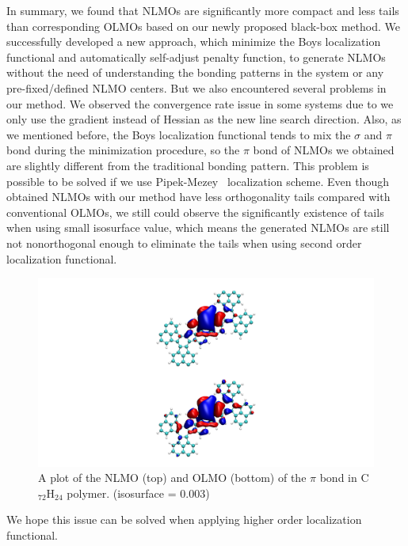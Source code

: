 \documentclass[aps,prl,reprint,amsmath,amssymb]{revtex4-1}
\begin{document}
In summary, we found that NLMOs are significantly more compact and less tails than corresponding OLMOs based on our newly proposed black-box method. 
We successfully developed a new approach, which minimize the Boys localization functional and automatically self-adjust penalty function, to generate NLMOs without the need of understanding the bonding patterns in the system or any pre-fixed/defined NLMO centers.
But we also encountered several problems  in our method.
We observed the convergence rate issue in some systems due to we only use the gradient instead of Hessian as the new line search direction.
Also, as we mentioned before, the Boys localization functional tends to mix the $\sigma$ and $\pi$ bond during the minimization procedure, so the $\pi$ bond of NLMOs we obtained are slightly different from the traditional bonding pattern.
This problem is possible to be solved if we use Pipek-Mezey~\cite{pipek1989a_fast} localization scheme.
Even though obtained NLMOs with our method have less orthogonality tails compared with conventional OLMOs, we still could observe the significantly existence of tails when using small isosurface value, which means the generated NLMOs are still not nonorthogonal enough to eliminate the tails when using second order localization functional.
\begin{figure}[htbp]
\includegraphics[scale=0.6]{figure_5.pdf} 
  \caption{A plot of the NLMO (top) and OLMO (bottom) of the $\pi$ bond in C$_{72}$H$_{24}$ polymer. (isosurface = 0.003)}
\end{figure}
We hope this issue can be solved when applying higher order localization functional.

\end{document}
